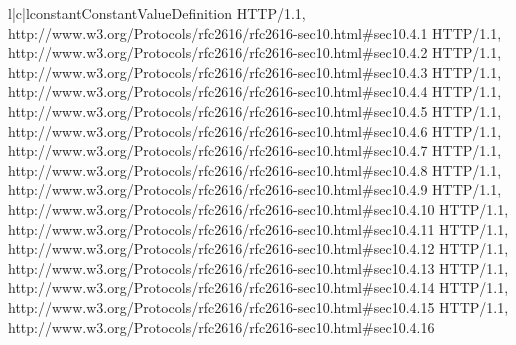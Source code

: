 \begin{tableiii}{l|c|l}{constant}{Constant}{Value}{Definition}
    {HTTP/1.1, 
      {http://www.w3.org/Protocols/rfc2616/rfc2616-sec10.html#sec10.4.1}}
    {HTTP/1.1, 
      {http://www.w3.org/Protocols/rfc2616/rfc2616-sec10.html#sec10.4.2}}
    {HTTP/1.1, 
      {http://www.w3.org/Protocols/rfc2616/rfc2616-sec10.html#sec10.4.3}}
    {HTTP/1.1, 
      {http://www.w3.org/Protocols/rfc2616/rfc2616-sec10.html#sec10.4.4}}
    {HTTP/1.1, 
      {http://www.w3.org/Protocols/rfc2616/rfc2616-sec10.html#sec10.4.5}}
    {HTTP/1.1, 
      {http://www.w3.org/Protocols/rfc2616/rfc2616-sec10.html#sec10.4.6}}
    {HTTP/1.1, 
      {http://www.w3.org/Protocols/rfc2616/rfc2616-sec10.html#sec10.4.7}}
    {}{HTTP/1.1, 
      {http://www.w3.org/Protocols/rfc2616/rfc2616-sec10.html#sec10.4.8}}
    {HTTP/1.1, 
      {http://www.w3.org/Protocols/rfc2616/rfc2616-sec10.html#sec10.4.9}}
    {HTTP/1.1, 
      {http://www.w3.org/Protocols/rfc2616/rfc2616-sec10.html#sec10.4.10}}
    {HTTP/1.1, 
      {http://www.w3.org/Protocols/rfc2616/rfc2616-sec10.html#sec10.4.11}}
    {HTTP/1.1, 
      {http://www.w3.org/Protocols/rfc2616/rfc2616-sec10.html#sec10.4.12}}
    {HTTP/1.1, 
      {http://www.w3.org/Protocols/rfc2616/rfc2616-sec10.html#sec10.4.13}}
    {}{HTTP/1.1, 
      {http://www.w3.org/Protocols/rfc2616/rfc2616-sec10.html#sec10.4.14}}
    {HTTP/1.1, 
      {http://www.w3.org/Protocols/rfc2616/rfc2616-sec10.html#sec10.4.15}}
    {HTTP/1.1, 
      {http://www.w3.org/Protocols/rfc2616/rfc2616-sec10.html#sec10.4.16}}

\end{tableiii}
